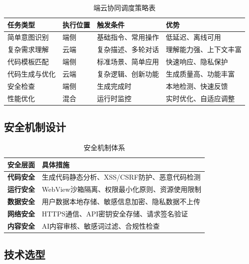 \documentclass[a4paper,12pt]{ctexart}
\newcommand{\highlight}[1]{\textcolor{vivoblue}{\textbf{#1}}}
\begin{document}
\begin{table}[H]
    \centering
    \caption{端云协同调度策略表}
    \begin{tabularx}{\textwidth}{|l|l|l|X|}
        \hline
        \textbf{任务类型} & \textbf{执行位置} & \textbf{触发条件} & \textbf{优势} \\
        \hline
        简单意图识别 & 端侧 & 基础指令、常用操作 & 低延迟、离线可用 \\
        \hline
        复杂需求理解 & 云端 & 复杂描述、多轮对话 & 理解能力强、上下文丰富 \\
        \hline
        代码模板匹配 & 端侧 & 标准场景、简单应用 & 快速响应、隐私保护 \\
        \hline
        代码生成与优化 & 云端 & 复杂逻辑、创新功能 & 生成质量高、功能丰富 \\
        \hline
        安全检查 & 端侧 & 生成完成时 & 本地检测、快速反馈 \\
        \hline
        性能优化 & 混合 & 运行时监控 & 实时优化、自适应调整 \\
        \hline
    \end{tabularx}
\end{table}

\subsection{安全机制设计}

\begin{table}[H]
    \centering
    \caption{安全机制体系}
    \begin{tabularx}{\textwidth}{|l|X|}
        \hline
        \textbf{安全层面} & \textbf{具体措施} \\
        \hline
        \highlight{代码安全} & 生成代码静态分析、XSS/CSRF防护、恶意代码检测 \\
        \hline
        \highlight{运行安全} & WebView沙箱隔离、权限最小化原则、资源使用限制 \\
        \hline
        \highlight{数据安全} & 用户数据本地存储、敏感信息加密、隐私数据不上传 \\
        \hline
        \highlight{网络安全} & HTTPS通信、API密钥安全存储、请求签名验证 \\
        \hline
        \highlight{内容安全} & AI内容审核、敏感词过滤、合规性检查 \\
        \hline
    \end{tabularx}
\end{table}

\subsection{技术选型}
\end{document}
